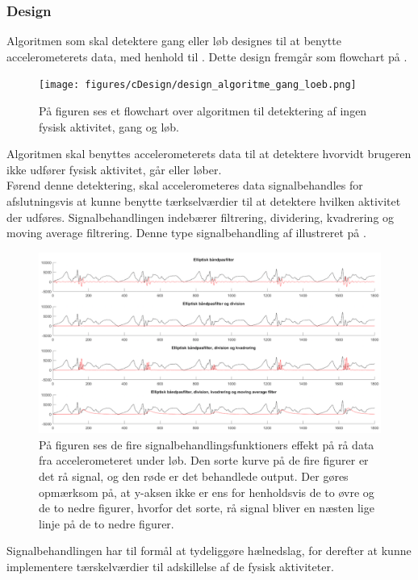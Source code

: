\subsubsection{Design} \label{design_algo_g_l}
Algoritmen som skal detektere gang eller løb designes til at benytte accelerometerets data, med henhold til . Dette design fremgår som flowchart på .
\begin{figure}[H]
	\centering
	\texttt{[image: figures/cDesign/design\_algoritme\_gang\_loeb.png]}
	\caption{På figuren ses et flowchart over algoritmen til detektering af ingen fysisk aktivitet, gang og løb.}
	\label{fig:design_algoritme_gang_loeb}
\end{figure}
Algoritmen skal benyttes accelerometerets data til at detektere hvorvidt brugeren ikke udfører fysisk aktivitet, går eller løber. \\
Førend denne detektering, skal accelerometeres data signalbehandles for afslutningsvis at kunne benytte tærkselværdier til at detektere hvilken aktivitet der udføres. Signalbehandlingen indebærer filtrering, dividering, kvadrering og moving average filtrering. Denne type signalbehandling af illustreret på .
\begin{figure}[H]
	\centering
	\includegraphics[width=1\textwidth]{figures/cDesign/signalbehandling_psoc.png}
	\caption{På figuren ses de fire signalbehandlingsfunktioners effekt på rå data fra accelerometeret under løb. Den sorte kurve på de fire figurer er det rå signal, og den røde er det behandlede output. Der gøres opmærksom på, at y-aksen ikke er ens for henholdsvis de to øvre og de to nedre figurer, hvorfor det sorte, rå signal bliver en næsten lige linje på de to nedre figurer.}
	\label{fig:algoritme_cykling2}
\end{figure}
Signalbehandlingen har til formål at tydeliggøre hælnedslag, for derefter at kunne implementere tærskelværdier til adskillelse af de fysisk aktiviteter. \\

